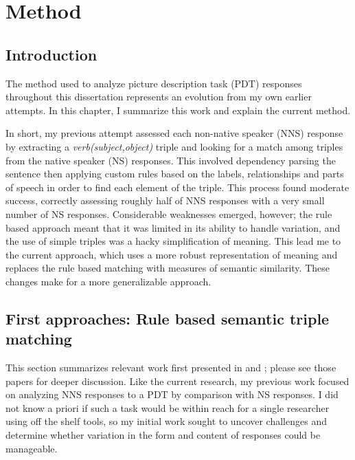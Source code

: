 \chapter{Method}
\label{chap:method}
%
%
%
%
%
%
%
%
%
%
%
%
\section{Introduction}
The method used to analyze picture description task (PDT) responses throughout this dissertation represents an evolution from my own earlier attempts. In this chapter, I summarize this work and explain the current method.

In short, my previous attempt assessed each non-native speaker (NNS) response by extracting a \textit{verb(subject,object)} triple and looking for a match among triples from the native speaker (NS) responses. This involved dependency parsing the sentence then applying custom rules based on the labels, relationships and parts of speech in order to find each element of the triple. This process found moderate success, correctly assessing roughly half of NNS responses with a very small number of NS responses. Considerable weaknesses emerged, however; the rule based approach meant that it was limited in its ability to handle variation, and the use of simple triples was a hacky simplification of meaning. This lead me to the current approach, which uses a more robust representation of meaning and replaces the rule based matching with measures of semantic similarity. These changes make for a more generalizable approach.

\section{First approaches: Rule based semantic triple matching}
This section summarizes relevant work first presented in \citet{king:dickinson:13} and \citet{king:dickinson:14}; please see those papers for deeper discussion. Like the current research, my previous work focused on analyzing NNS responses to a PDT by comparison with NS responses. I did not know a priori if such a task would be within reach for a single researcher using off the shelf tools, so my initial work sought to uncover challenges and determine whether variation in the form and content of responses could be manageable.

